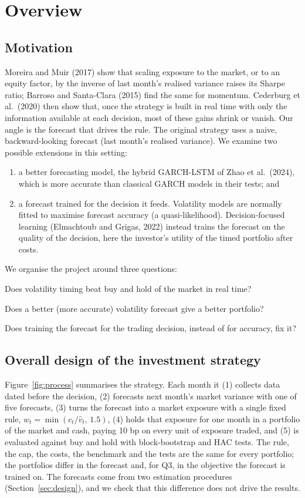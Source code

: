 \documentclass[12pt]{article}
\begin{document}
\section{Overview}
\subsection{Motivation}
Moreira and Muir (2017) show that scaling exposure to the market, or to an equity factor, by the inverse of last month's realised variance raises its Sharpe ratio; Barroso and Santa-Clara (2015) find the same for momentum. Cederburg et al.\ (2020) then show that, once the strategy is built in real time with only the information available at each decision, most of these gains shrink or vanish. Our angle is the forecast that drives the rule. The original strategy uses a naive, backward-looking forecast (last month's realised variance). We examine two possible extensions in this setting:
\begin{enumerate}[label=(\roman*)]
\item a better forecasting model, the hybrid GARCH-LSTM of Zhao et al.\ (2024), which is more accurate than classical GARCH models in their tests; and
\item a forecast trained for the decision it feeds. Volatility models are normally fitted to maximise forecast accuracy (a quasi-likelihood). Decision-focused learning (Elmachtoub and Grigas, 2022) instead trains the forecast on the quality of the decision, here the investor's utility of the timed portfolio after costs.
\end{enumerate}
We organise the project around three questions:
\begin{description}[labelwidth=2em,leftmargin=3em]
\item[Q1] Does volatility timing beat buy and hold of the market in real time?
\item[Q2] Does a better (more accurate) volatility forecast give a better portfolio?
\item[Q3] Does training the forecast for the trading decision, instead of for accuracy, fix it?
\end{description}

\subsection{Overall design of the investment strategy}
Figure~\ref{fig:process} summarises the strategy. Each month it (1) collects data dated before the decision, (2) forecasts next month's market variance with one of five forecasts, (3) turns the forecast into a market exposure with a single fixed rule, $w_t=\min(c_t/\hat v_t,\,1.5)$, (4) holds that exposure for one month in a portfolio of the market and cash, paying 10 bp on every unit of exposure traded, and (5) is evaluated against buy and hold with block-bootstrap and HAC tests. The rule, the cap, the costs, the benchmark and the tests are the same for every portfolio; the portfolios differ in the forecast and, for Q3, in the objective the forecast is trained on. The forecasts come from two estimation procedures (Section~\ref{sec:design}), and we check that this difference does not drive the results.
\end{document}
